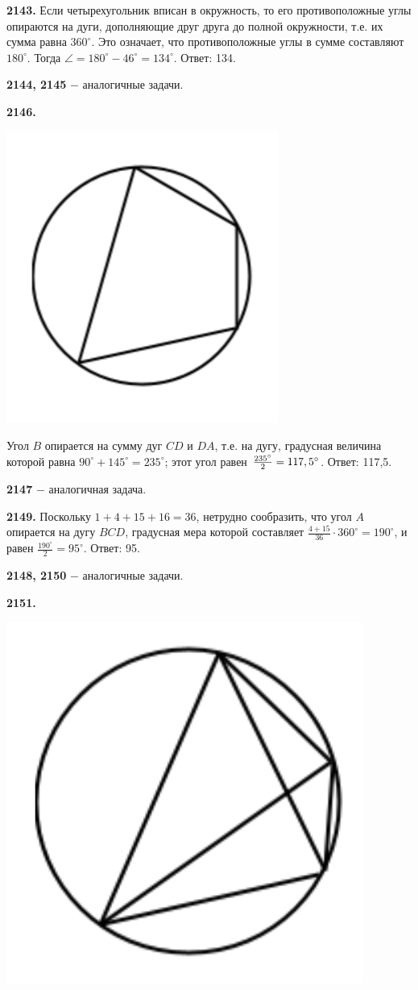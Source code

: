 \textbf{2143.} Если четырехугольник вписан в окружность, то его противоположные углы опираются на дуги, дополняющие друг друга до полной окружности, т.е. их сумма равна $360^\circ$. Это означает, что противоположные углы в сумме составляют $180^\circ$. Тогда $\angle = 180^\circ - 46^\circ=134^\circ$. \newline \null \hspace*{\fill} Ответ: 134.

\textbf{2144, 2145} $-$ аналогичные задачи.

\textbf{2146.}

{\centering \includegraphics[width=0.35\linewidth]{Geometry/Content/43.png}
	
}

Угол $B$ опирается на сумму дуг $CD$ и $DA$, т.е. на дугу, градусная величина которой равна $90^\circ+145^\circ=235^\circ$; этот угол равен $\linebreak \frac{235^\circ}{2}=117,5^\circ$. \newline \null \hspace*{\fill} Ответ: 117,5.

\textbf{2147} $-$ аналогичная задача.

\textbf{2149.}  Поскольку $1+4+15+16=36$, нетрудно сообразить, что угол $A$ опирается на дугу $BCD$, градусная мера которой составляет $\frac{4+15}{36}\cdot360^\circ=190^\circ$, и равен $\frac{190^\circ}{2}=95^\circ$. \newline \null \hspace*{\fill} Ответ: 95.

\textbf{2148, 2150} $-$ аналогичные задачи.

\textbf{2151.}

{\centering \includegraphics[width=0.35\linewidth]{Geometry/Content/44.png}
	
}

